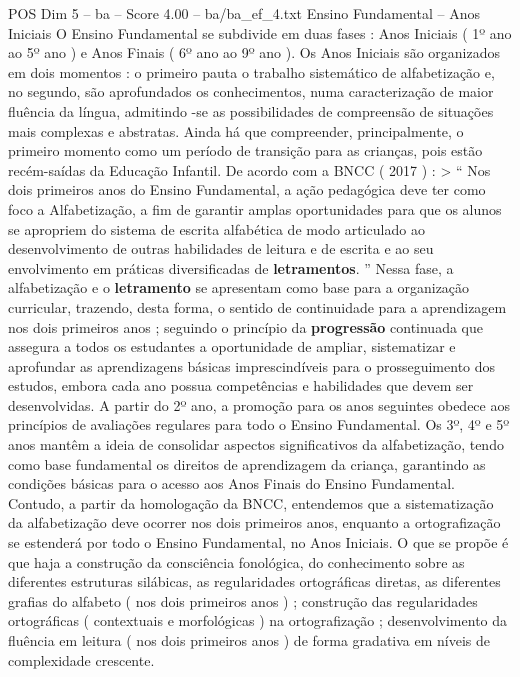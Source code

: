 \begin{textsample}{POS Dim 5 – ba – Score 4.00 – ba/ba\_ef\_4.txt}  \label{ex:f5_pos_277}
Ensino Fundamental – Anos Iniciais O Ensino Fundamental se subdivide em duas fases : Anos Iniciais ( 1º ano ao 5º ano ) e Anos Finais ( 6º ano ao 9º ano ).
Os Anos Iniciais são organizados em dois momentos : o primeiro pauta o trabalho sistemático de alfabetização e, no segundo, são aprofundados os conhecimentos, numa caracterização de maior fluência da língua, admitindo -se as possibilidades de compreensão de situações mais complexas e abstratas.
Ainda há que compreender, principalmente, o primeiro momento como um período de transição para as crianças, pois estão recém-saídas da Educação Infantil.
De acordo com a BNCC ( 2017 ) : > “ Nos dois primeiros anos do Ensino Fundamental, a ação pedagógica deve ter como foco a Alfabetização, a fim de garantir amplas oportunidades para que os alunos se apropriem do sistema de escrita alfabética de modo articulado ao desenvolvimento de outras habilidades de leitura e de escrita e ao seu envolvimento em práticas diversificadas de \textbf{letramentos}. ” Nessa fase, a alfabetização e o \textbf{letramento} se apresentam como base para a organização curricular, trazendo, desta forma, o sentido de continuidade para a aprendizagem nos dois primeiros anos ; seguindo o princípio da \textbf{progressão} continuada que assegura a todos os estudantes a oportunidade de ampliar, sistematizar e aprofundar as aprendizagens básicas imprescindíveis para o prosseguimento dos estudos, embora cada ano possua competências e habilidades que devem ser desenvolvidas.
A partir do 2º ano, a promoção para os anos seguintes obedece aos princípios de avaliações regulares para todo o Ensino Fundamental.
Os 3º, 4º e 5º anos mantêm a ideia de consolidar aspectos significativos da alfabetização, tendo como base fundamental os direitos de aprendizagem da criança, garantindo as condições básicas para o acesso aos Anos Finais do Ensino Fundamental.
Contudo, a partir da homologação da BNCC, entendemos que a sistematização da alfabetização deve ocorrer nos dois primeiros anos, enquanto a ortografização se estenderá por todo o Ensino Fundamental, no Anos Iniciais.
O que se propõe é que haja a construção da consciência fonológica, do conhecimento sobre as diferentes estruturas silábicas, as regularidades ortográficas diretas, as diferentes grafias do alfabeto ( nos dois primeiros anos ) ; construção das regularidades ortográficas ( contextuais e morfológicas ) na ortografização ; desenvolvimento da fluência em leitura ( nos dois primeiros anos ) de forma gradativa em níveis de complexidade crescente.

\end{textsample}
